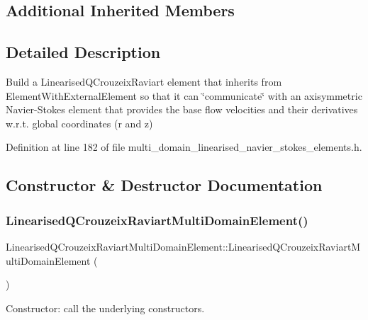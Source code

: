 \subsection*{Additional Inherited Members}


\subsection{Detailed Description}
Build a Linearised\+Q\+Crouzeix\+Raviart element that inherits from Element\+With\+External\+Element so that it can \char`\"{}communicate\char`\"{} with an axisymmetric Navier-\/\+Stokes element that provides the base flow velocities and their derivatives w.\+r.\+t. global coordinates (r and z) 

Definition at line 182 of file multi\+\_\+domain\+\_\+linearised\+\_\+navier\+\_\+stokes\+\_\+elements.\+h.



\subsection{Constructor \& Destructor Documentation}
\mbox{\label{classLinearisedQCrouzeixRaviartMultiDomainElement_aadd61b718fb0c041153c085a670e0beb}} 
\subsubsection{\texorpdfstring{Linearised\+Q\+Crouzeix\+Raviart\+Multi\+Domain\+Element()}{LinearisedQCrouzeixRaviartMultiDomainElement()}}
{\footnotesize\ttfamily Linearised\+Q\+Crouzeix\+Raviart\+Multi\+Domain\+Element\+::\+Linearised\+Q\+Crouzeix\+Raviart\+Multi\+Domain\+Element (\begin{DoxyParamCaption}{ }\end{DoxyParamCaption})\hspace{0.3cm}{\ttfamily [inline]}}



Constructor\+: call the underlying constructors. 

